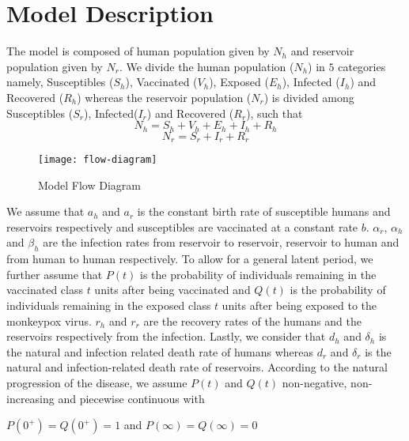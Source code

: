 \newcommand{\package}[1]{\textbf{#1}} %
\newcommand{\cmmd}[1]{\textbackslash\texttt{#1}} %


\chapter{Model Description}

The model is composed of human population given by $N_{h}$ and
reservoir population given by $N_{r}$. We divide the human population ($N_{h}$) in $5$ categories namely, Susceptibles ($S_{h}$), Vaccinated ($V_{h}$), Exposed ($E_{h}$), Infected ($I_{h}$) and Recovered ($R_{h}$) whereas the reservoir population ($N_{r}$) is divided among Susceptibles ($S_{r}$), Infected($I_{r}$) and Recovered ($R_{r}$), such that
\[N_{h} = S_{h} + V_{h} + E_{h} + I_{h} + R_{h}\]
\[N_{r} = S_{r} + I_{r} + R_{r}\]

\begin{figure}[h]
\texttt{[image: flow-diagram]}
\caption{Model Flow Diagram}
\centering
\end{figure}
We assume that $a_{h}$ and $a_{r}$ is the constant birth rate of susceptible humans and reservoirs respectively and susceptibles are vaccinated at a constant rate $b$. $\alpha_{r}$, $\alpha_{h}$ and $\beta_{h}$ are the infection rates from reservoir to reservoir, reservoir to human and from human to human respectively.
To allow for a general latent period, we further assume that $P(t)$ is the probability of individuals remaining in the vaccinated class $t$ units after being vaccinated and $Q(t)$ is the probability of individuals remaining in the exposed class $t$ units after being exposed to the monkeypox virus. $r_{h}$ and $r_{r}$ are the recovery rates of the humans and the reservoirs respectively from the infection. Lastly, we consider that $d_{h}$ and $\delta_{h}$ is the natural and infection related death rate of humans whereas $d_{r}$ and $\delta_{r}$ is the natural and infection-related death rate of reservoirs.
According to the natural progression of the disease, we assume $P(t)$ and $Q(t)$ non-negative, non-increasing and piecewise continuous with 
\begin{center}
$P(0^{+}) = Q(0^{+}) = 1$ and $P(\infty) = Q(\infty) = 0$
\end{center}



